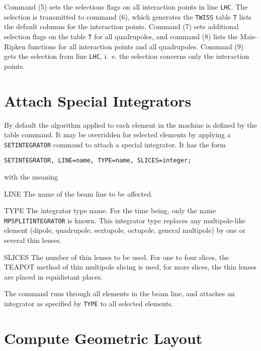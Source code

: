 Command (5) sets the selections flags on all interaction points in
line \texttt{LHC}.
The selection is transmitted to command (6), which generates the
\texttt{TWISS} table \texttt{T} lists the default columns for the
interaction points.
Command (7) sets additional selection flags on the table \texttt{T}
for all quadrupoles,
and command (8) lists the Mais-Ripken functions for all interaction
points and all quadrupoles.
Command (9) gets the selection from line \texttt{LHC}, i.~e. the
selection concerns only the interaction points.

\section{Attach Special Integrators}
\label{sec:setint}

By default the algorithm applied to each element in the machine is
defined by the table command.
It may be overridden for selected elements by applying a \texttt{SETINTEGRATOR}
command to attach a special integrator.
It has the form
\begin{verbatim}
SETINTEGRATOR, LINE=name, TYPE=name, SLICES=integer;
\end{verbatim}
with the meaning
\begin{kdescription}
\item[LINE]
  The name of the beam line to be affected.
\item[TYPE]
  The integrator type name.
  For the time being, only the name \\
  \texttt{MPSPLITINTEGRATOR} is known.
  This integrator type replaces any multipole-like element (dipole,
  quadrupole, sextupole, octupole, general multipole) by one or
  several thin lenses.
\item[SLICES]
  The number of thin lenses to be used.
  For one to four slices, the TEAPOT method of thin multipole slicing
  is used, for more slices, the thin lenses are placed in equidistant
  places.
\end{kdescription}
The command runs through all elements in the beam line,
and attaches an integrator as specified by \texttt{TYPE} to all
selected elements.


\section{Compute Geometric Layout}
\label{sec:survey}

